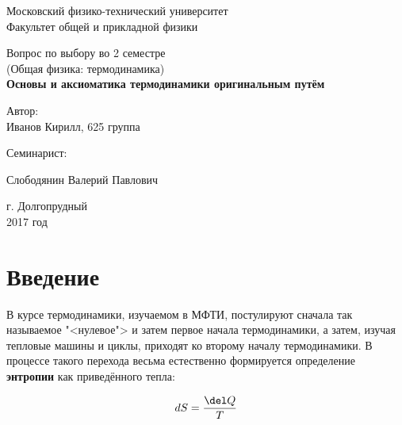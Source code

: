 \documentclass[12pt]{kiarticle}
\begin{document}
\begin{titlepage}
	\begin{center}
		\large 	Московский физико-технический университет \\
		Факультет общей и прикладной физики \\
		\vspace{0.2cm}
		
		\vspace{4.5cm}
		Вопрос по выбору во 2 семестре \\ \vspace{0.2cm}
		\large (Общая физика: термодинамика) \\ \vspace{0.2cm}
		\LARGE \textbf{Основы и аксиоматика термодинамики оригинальным путём}
	\end{center}
	\vspace{2.3cm} \large
	
	\begin{center}
		Автор: \\
		Иванов Кирилл,
		625 группа
		\vspace{10mm}
		
		Семинарист: 
		
		Слободянин Валерий Павлович
		
		
	\end{center}
	
	\begin{center} \vspace{50mm}
		г. Долгопрудный \\
		 2017 год
	\end{center}
\end{titlepage}


\section{Введение}

В курсе термодинамики, изучаемом в МФТИ, постулируют сначала так называемое "<нулевое"> и затем первое начала термодинамики, а затем, изучая тепловые машины и циклы, приходят ко второму началу термодинамики. В процессе такого перехода весьма естественно формируется определение \textbf{энтропии} как приведённого тепла: 

\begin{equation}\label{entmipt}
 dS = \dfrac{\del Q}{T}
\end{equation}
\end{document}
